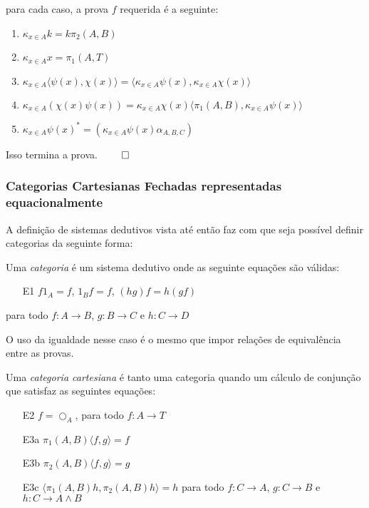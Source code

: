 \documentclass[../main.tex]{subfiles}
\begin{document}
para cada caso, a prova $f$ requerida é a seguinte:

\begin{enumerate}[label=(\roman*)]
    \item $\kappa_{x \in A} k = k \pi_2(A, B)$
    \item $\kappa_{x \in A} x = \pi_1(A, T)$
    \item $\kappa_{x \in A} \langle \psi(x), \chi(x) \rangle = \langle \kappa_{x \in A} \psi(x), \kappa_{x \in A} \chi(x) \rangle$
    \item $\kappa_{x \in A}(\chi(x)\psi(x)) = \kappa_{x \in A} \chi(x) \langle \pi_1(A, B), \kappa_{x \in A} \psi(x) \rangle$
    \item $\kappa_{x \in A}\psi(x)^{\ast} = (\kappa_{x \in A} \psi(x) \alpha_{A, B, C})$
\end{enumerate}

Isso termina a prova. $\qed$

\subsubsection{Categorias Cartesianas Fechadas representadas equacionalmente}

A definição de sistemas dedutivos vista até então faz com que seja possível definir categorias da seguinte forma:

\begin{definition}
    Uma \emph{categoria} é um sistema dedutivo onde as seguinte equações são válidas:
    \begin{enumerate}
        \item[E1] $f 1_A = f$, $1_B f = f$, $(hg)f = h(gf)$ 
    \end{enumerate}
    para todo $f: A \to B$, $g : B \to C$ e $h : C \to D$
\end{definition}

O uso da igualdade nesse caso é o mesmo que impor relações de equivalência entre as provas.

\begin{definition}
    Uma \emph{categoria cartesiana} é tanto uma categoria quando um cálculo de conjunção que satisfaz as seguintes equações:
    \begin{enumerate}
        \item[E2] $f = \bigcirc_A$, para todo $f : A \to T$
        \item[E3a] $\pi_1(A, B)\langle f, g \rangle = f$
        \item[E3b] $\pi_2(A, B)\langle f, g \rangle = g$
        \item[E3c] $\langle \pi_1(A, B) h, \pi_2(A, B) h \rangle = h$ para todo $f : C \to A$, $g : C \to B$ e $h : C \to A \land B$   
    \end{enumerate}
\end{definition}
\end{document}
